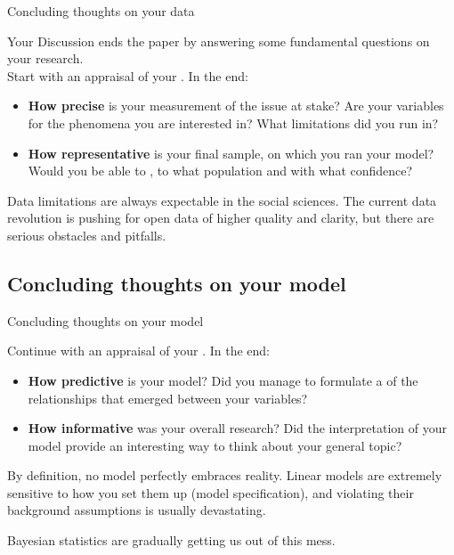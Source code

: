 \documentclass[t]{beamer}
\begin{document}
	\begin{frame}[t]{Concluding thoughts on your data}
	
	Your Discussion ends the paper by answering some fundamental questions on your research.\\[.5em]
	
	Start with an appraisal of your . In the end:\\[.5em]
	
		\begin{itemize}
			\item \textbf{How precise} is your measurement of the issue at stake? Are your variables  for the phenomena you are interested in? What limitations did you run in?
			
			\item \textbf{How representative} is your final sample, on which you ran your model? Would you be able to , to what population and with what confidence?
		\end{itemize}
	
	Data limitations are always expectable in the social sciences. The current data revolution is pushing for open data of higher quality and clarity, but there are serious obstacles and pitfalls.
	
	\end{frame}

	
	\subsection{Concluding thoughts on your model}

	\begin{frame}[t]{Concluding thoughts on your model}
	
	Continue with an appraisal of your . In the end:

		\begin{itemize}
			\item \textbf{How predictive} \red{[R-squared]} is your model? Did you manage to formulate a  of the relationships that emerged between your variables?
			
			\item \textbf{How informative} was your overall research? Did the interpretation of your model \red{[coefficients]} provide an interesting way to think about your general topic?
		\end{itemize}
	
	By definition, no model perfectly embraces reality. Linear models are extremely sensitive to how you set them up (model specification), and violating their background assumptions is usually devastating.\vspace{1em}
	
	Bayesian statistics are gradually getting us out of this mess.
	
	\end{frame}
					
\end{document}
